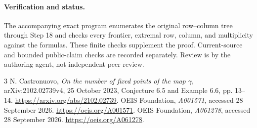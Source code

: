 \documentclass[11pt]{article}
\begin{document}
\paragraph{Verification and status.}
The accompanying exact program enumerates the original row--column
tree through Step 18 and checks every frontier, extremal row, column,
and multiplicity against the formulas. These finite checks supplement
the proof. Current-source and bounded public-claim checks are recorded
separately. Review is by the authoring agent, not independent peer review.

\begin{thebibliography}{3}
 N. Castronuovo, \emph{On the number of fixed points of the
map $\gamma$}, arXiv:2102.02739v4, 25 October 2023,
Conjecture 6.5 and Example 6.6, pp. 13--14.
\url{https://arxiv.org/abs/2102.02739}.
 OEIS Foundation, \emph{A001571}, accessed 28 September 2026.
\url{https://oeis.org/A001571}.
 OEIS Foundation, \emph{A061278}, accessed 28 September 2026.
\url{https://oeis.org/A061278}.
\end{thebibliography}
\end{document}
